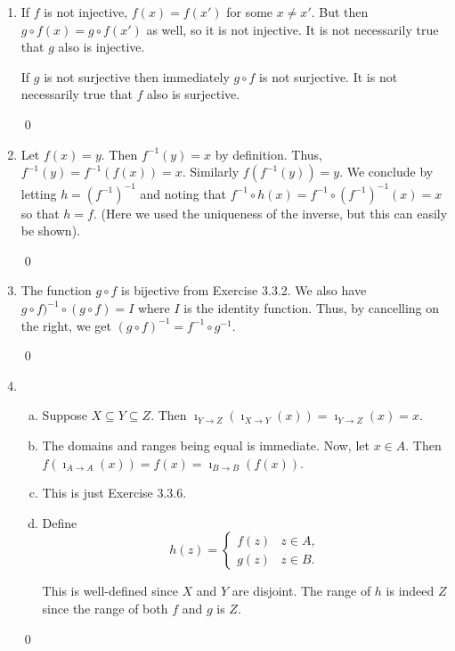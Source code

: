 \begin{enumerate}[Ex. 3.3.1.]
    \qed

    \item If $f$ is not injective, $f(x) = f(x')$ for some $x\neq x'$. But then
    $g\circ f(x) = g\circ f(x')$ as well, so it is not injective. It is not
    necessarily true that $g$ also is injective.

    If $g$ is not surjective then immediately $g\circ f$ is not surjective. It
    is not necessarily true that $f$ also is surjective.

    \qed

    \item Let $f(x) = y$. Then $f^{-1}(y) = x$ by definition. Thus,
    $f^{-1}(y) = f^{-1}(f(x)) = x$. Similarly $f(f^{-1}(y)) = y$. We conclude
    by letting $h = (f^{-1})^{-1}$ and noting that $f^{-1}\circ h(x) = f^{-1}\circ
    (f^{-1})^{-1}(x) = x$ so that $h = f$. (Here we used the uniqueness of the inverse,
    but this can easily be shown).

    \qed

    \item The function $g\circ f$ is bijective from Exercise 3.3.2. We also have
    $g\circ f)^{-1}\circ(g\circ f) = I$ where $I$ is the identity function. Thus,
    by cancelling on the right, we get $(g\circ f)^{-1} = f^{-1}\circ g^{-1}$.

    \qed

    \item
    \begin{enumerate}[(a)]
        \item Suppose $X\subseteq Y\subseteq Z$. Then $\imath_{Y\to Z}(\imath_{X\to Y}(x)) =
        \imath_{Y\to Z}(x) = x$. 

        \item The domains and ranges being equal is immediate. Now, let $x\in A$. Then
        $f(\imath_{A\to A}(x)) = f(x) = \imath_{B\to B}(f(x))$.

        \item This is just Exercise 3.3.6.

        \item Define
        \[ h(z) = \begin{cases}
            f(z) & z\in A, \\
            g(z) & z\in B.
        \end{cases} \]

        This is well-defined since $X$ and $Y$ are disjoint. The range of $h$ is
        indeed $Z$ since the range of both $f$ and $g$ is $Z$.
    \end{enumerate}

    \qed
\end{enumerate}


